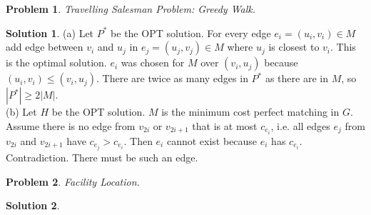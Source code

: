 \documentclass{article}
\newtheorem{problem}{Problem}
\theoremstyle{definition}
\newtheorem*{solution}{Solution}
\begin{document}
\begin{problem} 

Travelling Salesman Problem: Greedy Walk.

\end{problem}

\begin{solution}

(a) Let \(P^*\) be the OPT solution. For every edge \(e_i=(u_i,v_i)\in M\) add edge between \(v_i\) and \(u_j\) in \(e_j=(u_j,v_j)\in M\) where \(u_j\) is closest to \(v_i\). This is the optimal solution. \(e_i\) was chosen for \(M\) over \((v_i, u_j)\) because \((u_i,v_i)\leq (v_i,u_j)\). There are twice as many edges in \(P^*\) as there are in \(M\), so \(|P^*|\geq 2|M|\). \\

(b) Let \(H\) be the OPT solution. \(M\) is the minimum cost perfect matching in \(G\). Assume there is no edge from \(v_{2i}\) or \(v_{2i+1}\) that is at most \(c_{e_i}\), i.e. all edges \(e_j\) from \(v_{2i}\) and \(v_{2i+1}\) have \(c_{e_j}>c_{e_i}\). Then \(e_i\) cannot exist because \(e_i\) has \(c_{e_i}\). Contradiction. There must be such an edge. \\

\end{solution}

\begin{problem} 

Facility Location.

\end{problem}

\begin{solution}

\end{solution}
\end{document}
